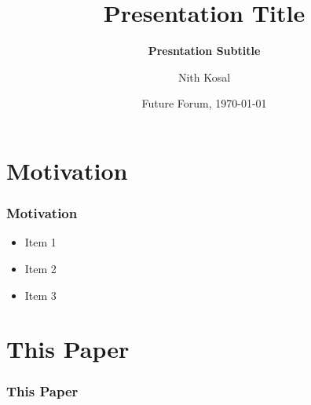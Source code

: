 \documentclass[11pt]{beamer}
\begin{document}
	\author[Nith Kosal]{Nith Kosal}
	\title[Presentation Title]{\bfseries Presentation Title}
	\subtitle{\bfseries Presntation Subtitle}

	
	\date[\today]{Future Forum, \today}

	\begin{frame}[plain]
		\maketitle
		
	\end{frame}
	\setcounter{framenumber}{0}
	\section{Motivation}
	\begin{frame}
		\frametitle{\bfseries Motivation}
		
		\begin{itemize}
			\item<1-> Item 1
			\item<2-> Item 2 
			\item<3-> Item 3
		\end{itemize}
		
	\end{frame}
\section[]{This Paper}
	\begin{frame}

		\frametitle{\bfseries This Paper}
		
		
	\end{frame}
\end{document}
